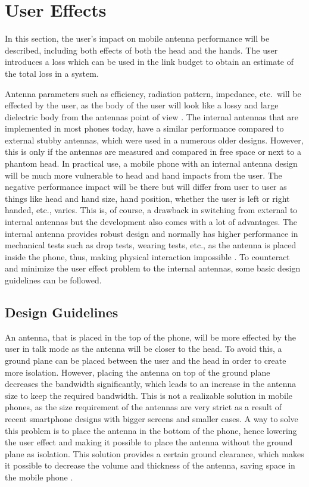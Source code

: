 \section{User Effects}
\label{se:user_effects}
\begin{aautop}
    In this section, the user's impact on mobile antenna performance will be described, including both effects of both the head and the hands. The user introduces a loss which can be used in the link budget to obtain an estimate of the total loss in a system.
\end{aautop}

Antenna parameters such as efficiency, radiation pattern, impedance, etc.\ will be effected by the user, as the body of the user will look like a lossy and large dielectric body from the antennas point of view \cite{balanis2008modern}.
The internal antennas that are implemented in most phones today, have a similar performance compared to external stubby antennas, which were used in a numerous older designs. However, this is only if the antennas are measured and compared in free space or next to a phantom head. In practical use, a mobile phone with an internal antenna design will be much more vulnerable to head and hand impacts from the user. 
The negative performance impact will be there but will differ from user to user as things like head and hand size, hand position, whether the user is left or right handed, etc., varies. This is, of course, a drawback in switching from external to internal antennas but the development also comes with a lot of advantages. The internal antenna provides robust design and normally has higher performance in mechanical tests such as drop tests, wearing tests, etc., as the antenna is placed inside the phone, thus, making physical interaction impossible \cite{balanis2008modern}. 
To counteract and minimize the user effect problem to the internal antennas, some basic design guidelines can be followed.

\subsection{Design Guidelines}
An antenna, that is placed in the top of the phone, will be more effected by the user in talk mode as the antenna will be closer to the head. To avoid this, a ground plane can be placed between the user and the head in order to create more isolation. However, placing the antenna on top of the ground plane decreases the bandwidth significantly, which leads to an increase in the antenna size to keep the required bandwidth. This is not a realizable solution in mobile phones, as the size requirement of the antennas are very strict as a result of recent smartphone designs with bigger screens and smaller cases. A way to solve this problem is to place the antenna in the bottom of the phone, hence lowering the user effect and making it possible to place the antenna without the ground plane as isolation. This solution provides a certain ground clearance, which makes it possible to decrease the volume and thickness of the antenna, saving space in the mobile phone \cite{balanis2008modern}. 

